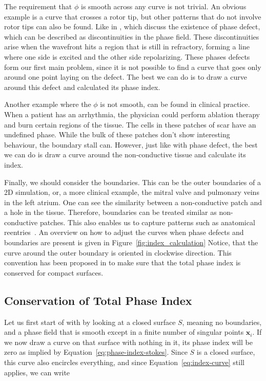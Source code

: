 \documentclass[twocolumn]{article}
\begin{document}
The requirement that $\phi$ is smooth across any curve is not trivial.
An obvious example is a curve that crosses a rotor tip,
but other patterns that do not involve rotor tips can also be found.
Like in \textcite{arno2021a, tomii2021spatial}, which discuss the existence of phase defect,
which can be described as discontinuities in the phase field.
These discontinuities arise when the wavefront hits a region that is still in refractory,
forming a line where one side is excited and the other side repolarizing.
These phases defects form our first main problem,
since it is not possible to find a curve that goes only around one point laying on the defect.
The best we can do is to draw a curve around this defect and calculated its phase index.

Another example where the $\phi$ is not smooth,
can be found in clinical practice.
When a patient has an arrhythmia,
the physician could perform ablation therapy
and burn  certain regions of the tissue.
The cells in these patches of scar have an undefined phase.
While the bulk of these patches don't show interesting behaviour,
the boundary stall can.
However, just like with phase defect,
the best we can do is draw a curve around the non-conductive tissue
and calculate its index.

Finally, we should consider the boundaries.
This can be the outer boundaries of a 2D simulation,
or, a more clinical example, the mitral valve and pulmonary veins in the left atrium.
One can see the similarity between a non-conductive patch
and a hole in the tissue.
Therefore, boundaries can be treated similar as non-conductive patches.
This also enables us to capture patterns such as anatomical reentries~\autocite{duytschaever2024atrial}.
An overview on how to adjust the curves when phase defects and boundaries are present is given in Figure~\ref{fig:index_calculation}
Notice, that the curve around the outer boundary is oriented in clockwise direction.
This convention has been proposed in \textcite{davidsen2004topological} to make sure
that the total phase index is conserved for compact surfaces.

\subsection{Conservation of Total Phase Index}

Let us first start of with by looking at a closed surface $S$, meaning no boundaries,
and a phase field that is smooth except in a finite number of singular points $\bm{x}_i$.
If we now draw a curve on that surface with nothing in it,
its phase index will be zero as implied by Equation~\ref{eq:phase-index-stokes}.
Since \(S\) is a closed surface, this curve also encircles everything,
and since Equation~\ref{eq:index-curve} still applies,
we can write
\end{document}
